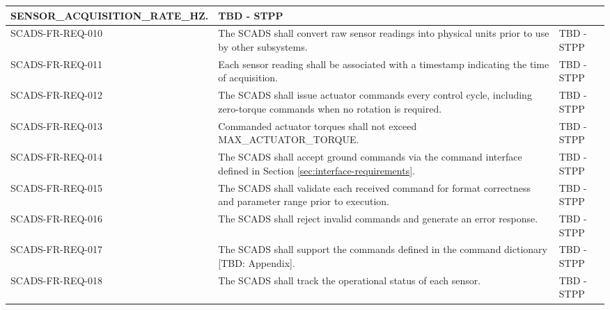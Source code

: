 \documentclass{article}
\begin{document}
\begin{longtable}{|l|p{9cm}|p{5cm}|}
                                   SENSOR\_ACQUISITION\_RATE\_HZ.
                                 & TBD - STPP \\ \hline
                SCADS-FR-REQ-010 & The SCADS shall convert raw sensor readings into 
                                   physical units prior to use by other subsystems.
                                 & TBD - STPP \\ \hline
                SCADS-FR-REQ-011 & Each sensor reading shall be associated with a 
                                   timestamp indicating the time of acquisition.
                                 & TBD - STPP \\ \hline
                SCADS-FR-REQ-012 & The SCADS shall issue actuator commands every 
                                   control cycle, including zero-torque commands 
                                   when no rotation is required.
                                 & TBD - STPP \\ \hline
                SCADS-FR-REQ-013 & Commanded actuator torques shall not exceed 
                                   MAX\_ACTUATOR\_TORQUE.
                                 & TBD - STPP \\ \hline
                SCADS-FR-REQ-014 & The SCADS shall accept ground commands via the 
                                   command interface defined in Section 
                                   \ref{sec:interface-requirements}.
                                 & TBD - STPP \\ \hline
                SCADS-FR-REQ-015 & The SCADS shall validate each received command 
                                   for format correctness and parameter range 
                                   prior to execution.
                                 & TBD - STPP \\ \hline
                SCADS-FR-REQ-016 & The SCADS shall reject invalid commands and 
                                   generate an error response.
                                 & TBD - STPP \\ \hline
                SCADS-FR-REQ-017 & The SCADS shall support the commands defined in 
                                   the command dictionary [TBD: Appendix].
                                 & TBD - STPP \\ \hline
                SCADS-FR-REQ-018 & The SCADS shall track the operational status of 
                                   each sensor.
                                 & TBD - STPP \\ \hline

\end{longtable}
\end{document}
